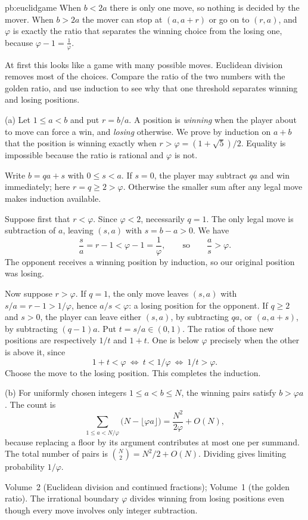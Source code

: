 \begin{solution}{pb:euclidgame}
\idea When $b<2a$ there is only one move, so nothing is decided by the mover. When $b>2a$ the mover can stop at
$(a,a+r)$ or go on to $(r,a)$, and $\varphi$ is exactly the ratio that separates the winning choice from the losing one,
because $\varphi-1=\frac1\varphi$.

\writeup
At first this looks like a game with many possible moves. Euclidean division removes most of the choices. Compare the ratio of the two numbers with the golden ratio, and use induction to see why that one threshold separates winning and losing positions.

 (a) Let $1\le a<b$ and put $r=b/a$. A position is \emph{winning} when the player about to move can force a win, and \emph{losing} otherwise. We prove by induction on $a+b$ that the position is winning exactly when $r>\varphi=(1+\sqrt5)/2$. Equality is impossible because the ratio is rational and $\varphi$ is not.

Write $b=qa+s$ with $0\le s<a$. If $s=0$, the player may subtract $qa$ and win immediately; here $r=q\ge2>\varphi$. Otherwise the smaller sum after any legal move makes induction available.

Suppose first that $r<\varphi$. Since $\varphi<2$, necessarily $q=1$. The only legal move is subtraction of $a$, leaving $(s,a)$ with $s=b-a>0$. We have
\[
\frac sa=r-1<\varphi-1=\frac1\varphi,
\qquad\text{so}\qquad \frac as>\varphi.
\]
The opponent receives a winning position by induction, so our original position was losing.

Now suppose $r>\varphi$. If $q=1$, the only move leaves $(s,a)$ with $s/a=r-1>1/\varphi$, hence $a/s<\varphi$: a losing position for the opponent. If $q\ge2$ and $s>0$, the player can leave either $(s,a)$, by subtracting $qa$, or $(a,a+s)$, by subtracting $(q-1)a$. Put $t=s/a\in(0,1)$. The ratios of those new positions are respectively $1/t$ and $1+t$. One is below $\varphi$ precisely when the other is above it, since
\[
1+t<\varphi\ \Longleftrightarrow\ t<1/\varphi\
\Longleftrightarrow\ 1/t>\varphi.
\]
Choose the move to the losing position. This completes the induction.

(b) For uniformly chosen integers $1\le a<b\le N$, the winning pairs satisfy $b>\varphi a$. The count is
\[
\sum_{1\le a<N/\varphi}\bigl(N-\lfloor\varphi a\rfloor\bigr)
=\frac{N^2}{2\varphi}+O(N),
\]
because replacing a floor by its argument contributes at most one per summand. The total number of pairs is $\binom N2=N^2/2+O(N)$. Dividing gives limiting probability $1/\varphi$.

\tools Volume~2 (Euclidean division and continued fractions); Volume~1 (the golden ratio).
\leads The irrational boundary $\varphi$ divides winning from losing positions even though every move involves only integer subtraction.
\end{solution}

